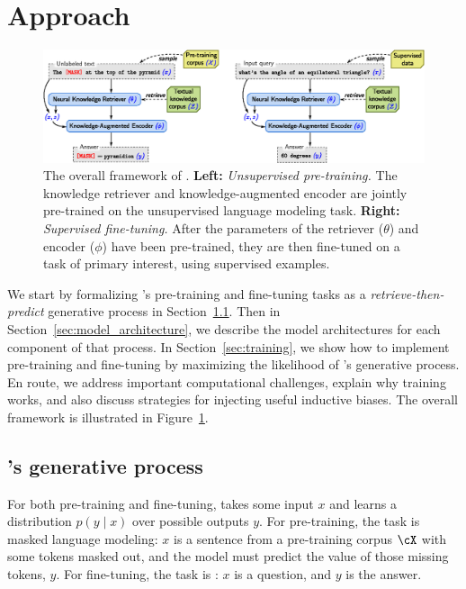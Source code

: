 \section{Approach} \label{sec:approach}
\begin{figure}[t!]
\centering
\includegraphics[width=.9\textwidth]{figures/pretrain_finetune.eps}
\caption{The overall framework of \thename. {\bf Left:} {\em Unsupervised pre-training.} The knowledge retriever and knowledge-augmented encoder are jointly pre-trained on the unsupervised language modeling task. 
{\bf Right:} {\em Supervised fine-tuning.} After the parameters of the retriever ($\theta$) and encoder ($\phi$) have been pre-trained, they are then fine-tuned on a task of primary interest, using supervised examples.}
\label{fig:approach}
\end{figure}

We start by formalizing \thename's pre-training and fine-tuning tasks as a {\em retrieve-then-predict} generative process in Section~\ref{sec:generative_process}. Then in Section~\ref{sec:model_architecture}, we describe the model architectures for each component of that process. In Section~\ref{sec:training}, we show how to implement \thename pre-training and fine-tuning by maximizing the likelihood of \thename's generative process. En route, we address important computational challenges, explain why training works, and also discuss strategies for injecting useful inductive biases. The overall framework is illustrated in Figure~\ref{fig:approach}.

\subsection{\thename's generative process}
\label{sec:generative_process}
%
For both pre-training and fine-tuning, \thename takes some input $x$ and learns a distribution $p(y \mid x)$ over possible outputs $y$. %
For pre-training, the task is masked language modeling: $x$ is a sentence from a pre-training corpus $\cX$ with some tokens masked out, and the model must predict the value of those missing tokens, $y$. For fine-tuning, the task is \openqa: $x$ is a question, and $y$ is the answer.

